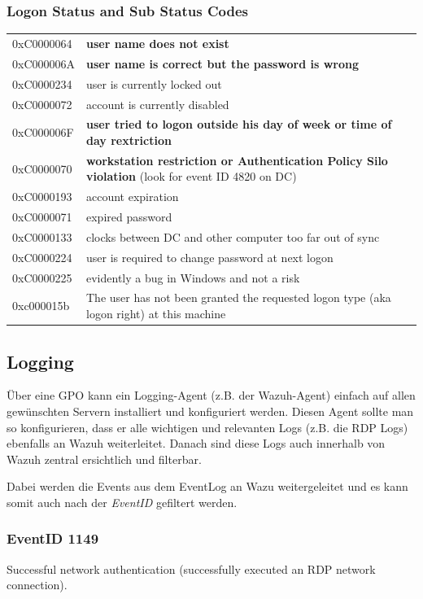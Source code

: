 \subsubsection{Logon Status and Sub Status Codes}
\begin{tabular}{ l | p{4.5cm} }
    0xC0000064 & \textbf{user name does not exist} \\
    0xC000006A & \textbf{user name is correct but the password is wrong} \\  
    0xC0000234 & user is currently locked out \\  
    0xC0000072 & account is currently disabled \\
    0xC000006F & \textbf{user tried to logon outside his day of week or time of day rextriction} \\
    0xC0000070 & \textbf{workstation restriction or Authentication Policy Silo violation} (look for event ID 4820 on DC) \\
    0xC0000193 & account expiration \\
    0xC0000071 & expired password \\
    0xC0000133 & clocks between DC and other computer too far out of sync \\
    0xC0000224 & user is required to change password at next logon \\
    0xC0000225 & evidently a bug in Windows and not a risk \\
    0xc000015b & The user has not been granted the requested logon type (aka logon right) at this machine
\end{tabular}

\subsection{Logging}
Über eine GPO kann ein Logging-Agent (z.B. der Wazuh-Agent) einfach auf allen gewünschten Servern installiert und konfiguriert werden. Diesen Agent sollte man so konfigurieren, dass er alle wichtigen und relevanten Logs (z.B. die RDP Logs) ebenfalls an Wazuh weiterleitet. Danach sind diese Logs auch innerhalb von Wazuh zentral ersichtlich und filterbar.

Dabei werden die Events aus dem EventLog an Wazu weitergeleitet und es kann somit auch nach der \textit{EventID} gefiltert werden.

\subsubsection{EventID 1149}
Successful network authentication (successfully executed an RDP network connection).

